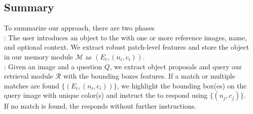 \subsection{Summary}
\vspace{-0.2cm}
To summarize our approach, there are two phases\\
: The user introduces  an object to the \VLM with one or more reference images, name, and optional context. We extract robust patch-level features and store the object in our memory module $\mathcal{M}$ as $(E_i, (n_i, c_i))$.\\
: 
Given an image and a question $Q$, we extract object proposals and query our retrieval module $\mathcal{R}$ with the bounding boxes features.
If a match or multiple matches are found $\{(E_i, (n_i, c_i))\}$, we highlight the bounding box(es) on the query image with  unique color(s)  and instruct the \VLM to respond using $ \{(n_j,c_j)\}$.
If no match is found, the \VLM responds without further instructions.




